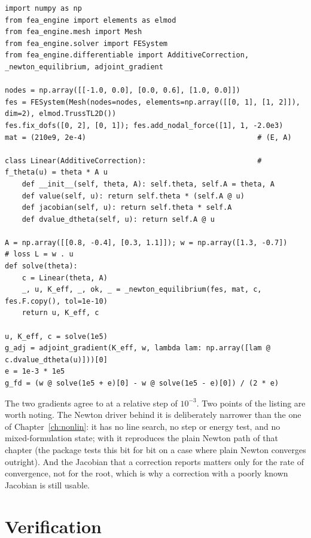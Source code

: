 \begin{lstlisting}[caption={Newton solve of a corrected two-bar truss and the adjoint gradient of a loss through it, checked by a central difference (NumPy only).},label={lst:df-run}]
import numpy as np
from fea_engine import elements as elmod
from fea_engine.mesh import Mesh
from fea_engine.solver import FESystem
from fea_engine.differentiable import AdditiveCorrection, _newton_equilibrium, adjoint_gradient

nodes = np.array([[-1.0, 0.0], [0.0, 0.6], [1.0, 0.0]])
fes = FESystem(Mesh(nodes=nodes, elements=np.array([[0, 1], [1, 2]]), dim=2), elmod.TrussTL2D())
fes.fix_dofs([0, 2], [0, 1]); fes.add_nodal_force([1], 1, -2.0e3)
mat = (210e9, 2e-4)                                        # (E, A)

class Linear(AdditiveCorrection):                          # f_theta(u) = theta * A u
    def __init__(self, theta, A): self.theta, self.A = theta, A
    def value(self, u): return self.theta * (self.A @ u)
    def jacobian(self, u): return self.theta * self.A
    def dvalue_dtheta(self, u): return self.A @ u

A = np.array([[0.8, -0.4], [0.3, 1.1]]); w = np.array([1.3, -0.7])      # loss L = w . u
def solve(theta):
    c = Linear(theta, A)
    _, u, K_eff, _, ok, _ = _newton_equilibrium(fes, mat, c, fes.F.copy(), tol=1e-10)
    return u, K_eff, c

u, K_eff, c = solve(1e5)
g_adj = adjoint_gradient(K_eff, w, lambda lam: np.array([lam @ c.dvalue_dtheta(u)]))[0]
e = 1e-3 * 1e5
g_fd = (w @ solve(1e5 + e)[0] - w @ solve(1e5 - e)[0]) / (2 * e)
\end{lstlisting}

The two gradients agree to \adaTwoErrMid{} at a relative step of $10^{-3}$. Two points of the listing are worth noting. The Newton driver behind it is deliberately narrower than the one of Chapter~\ref{ch:nonlin}: it has no line search, no step or energy test, and no mixed-formulation state; with  it reproduces the plain Newton path of that chapter (the package tests this bit for bit on a case where plain Newton converges outright). And the Jacobian that a correction reports matters only for the rate of convergence, not for the root, which is why a correction with a poorly known Jacobian is still usable.

\section{Verification}\label{sec:df-verif}

